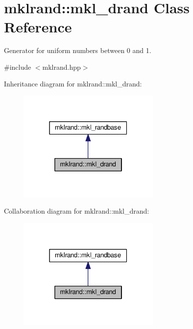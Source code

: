 \hypertarget{classmklrand_1_1mkl__drand}{}\section{mklrand\+:\+:mkl\+\_\+drand Class Reference}
\label{classmklrand_1_1mkl__drand}


Generator for uniform numbers between 0 and 1.  




{\ttfamily \#include $<$mklrand.\+hpp$>$}



Inheritance diagram for mklrand\+:\+:mkl\+\_\+drand\+:\nopagebreak
\begin{figure}[H]
\begin{center}
\leavevmode
\includegraphics[width=198pt]{dd/de7/classmklrand_1_1mkl__drand__inherit__graph}
\end{center}
\end{figure}


Collaboration diagram for mklrand\+:\+:mkl\+\_\+drand\+:\nopagebreak
\begin{figure}[H]
\begin{center}
\leavevmode
\includegraphics[width=198pt]{d7/d53/classmklrand_1_1mkl__drand__coll__graph}
\end{center}
\end{figure}

